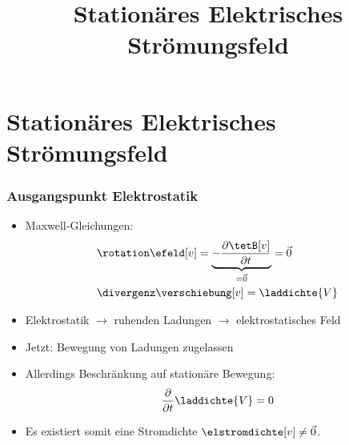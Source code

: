 

\title[TET: Stationäres Elektrisches Strömungsfeld]{Stationäres Elektrisches Strömungsfeld}


% 
% 

\maketitle

% 
% 
\section{Stationäres Elektrisches Strömungsfeld}

\begin{frame}

  \frametitle{Ausgangspunkt Elektrostatik}

  \begin{itemize}[<+->]
    \item Maxwell-Gleichungen:
\begin{align*}
	& \rotation\efeld[v] = \underbrace{-\dfrac{\partial \tetB[v]}{\partial t}}_{=\vec{0}} = \vec{0} \\
	& \divergenz \verschiebung[v] = \laddichte{V} 
\end{align*}
\item Elektrostatik $\to$ \alert{ruhenden} Ladungen $\to$ \alert{elektrostatisches Feld}
\item Jetzt: \alert{Bewegung von Ladungen zugelassen}
  \item Allerdings Beschränkung auf \alert{stationäre Bewegung}:
\begin{equation*}
	\dfrac{\partial}{\partial t} \laddichte{V} = 0 
      \end{equation*}
 \item Es existiert somit eine Stromdichte \alert{\(\elstromdichte[v] \neq \vec{0} \)}.
\end{itemize}

\end{frame}

